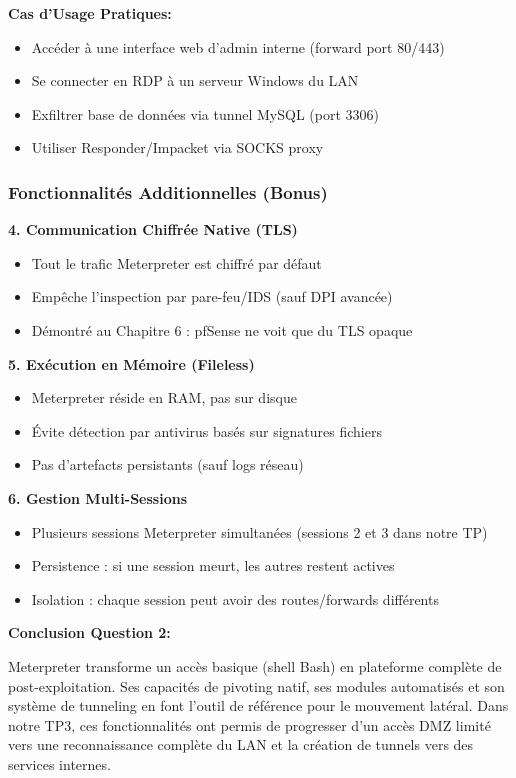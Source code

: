 \documentclass[12pt,a4paper,openany]{report}
\begin{document}
	\textbf{Cas d'Usage Pratiques:}
	\begin{itemize}
		\item Accéder à une interface web d'admin interne (forward port 80/443)
		\item Se connecter en RDP à un serveur Windows du LAN
		\item Exfiltrer base de données via tunnel MySQL (port 3306)
		\item Utiliser Responder/Impacket via SOCKS proxy
	\end{itemize}
	
	\subsubsection{Fonctionnalités Additionnelles (Bonus)}
	
	\textbf{4. Communication Chiffrée Native (TLS)}
	
	\begin{itemize}
		\item Tout le trafic Meterpreter est chiffré par défaut
		\item Empêche l'inspection par pare-feu/IDS (sauf DPI avancée)
		\item Démontré au Chapitre 6 : pfSense ne voit que du TLS opaque
	\end{itemize}
	
	\textbf{5. Exécution en Mémoire (Fileless)}
	
	\begin{itemize}
		\item Meterpreter réside en RAM, pas sur disque
		\item Évite détection par antivirus basés sur signatures fichiers
		\item Pas d'artefacts persistants (sauf logs réseau)
	\end{itemize}
	
	\textbf{6. Gestion Multi-Sessions}
	
	\begin{itemize}
		\item Plusieurs sessions Meterpreter simultanées (sessions 2 et 3 dans notre TP)
		\item Persistence : si une session meurt, les autres restent actives
		\item Isolation : chaque session peut avoir des routes/forwards différents
	\end{itemize}
	
	\textbf{Conclusion Question 2:}
	
	Meterpreter transforme un accès basique (shell Bash) en plateforme 
	complète de post-exploitation. Ses capacités de pivoting natif, ses 
	modules automatisés et son système de tunneling en font l'outil de 
	référence pour le mouvement latéral. Dans notre TP3, ces fonctionnalités 
	ont permis de progresser d'un accès DMZ limité vers une reconnaissance 
	complète du LAN et la création de tunnels vers des services internes.
	
\end{document}
